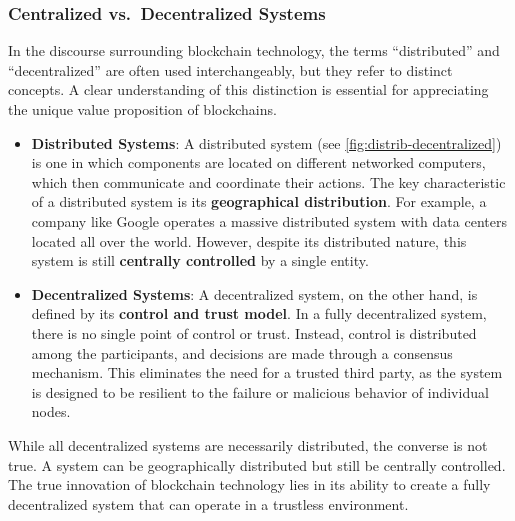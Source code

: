 \subsubsection{Centralized vs.~Decentralized
	Systems}\label{centralized-vs.-decentralized-systems}

In the discourse surrounding blockchain technology, the terms
``distributed'' and ``decentralized'' are often used interchangeably,
but they refer to distinct concepts. A clear understanding of this
distinction is essential for appreciating the unique value proposition
of blockchains.

\begin{itemize}
	\item
	\textbf{Distributed Systems}: A distributed system (see \autoref{fig:distrib-decentralized}) is one in which
	components are located on different networked computers, which then
	communicate and coordinate their actions. The key characteristic of a
	distributed system is its \textbf{geographical distribution}. For
	example, a company like Google operates a massive distributed system
	with data centers located all over the world. However, despite its
	distributed nature, this system is still \textbf{centrally controlled}
	by a single entity.
	\item
	\textbf{Decentralized Systems}: A decentralized system, on the other
	hand, is defined by its \textbf{control and trust model}. In a fully
	decentralized system, there is no single point of control or trust.
	Instead, control is distributed among the participants, and decisions
	are made through a consensus mechanism. This eliminates the need for a
	trusted third party, as the system is designed to be resilient to the
	failure or malicious behavior of individual nodes.
\end{itemize}

While all decentralized systems are necessarily distributed, the
converse is not true. A system can be geographically distributed but
still be centrally controlled. The true innovation of blockchain
technology lies in its ability to create a fully decentralized system
that can operate in a trustless environment.


